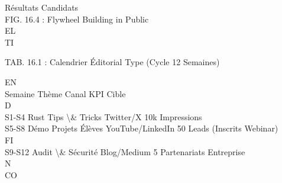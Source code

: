 \documentclass[12pt,landscape,a4paper]{article}
\begin{document}
\vspace{0.5em}
\vspace{0.5em}
\vspace{0.5em}
\vspace{0.5em}
Résultats      Candidats\\
\vspace{0.5em}
\vspace{0.5em}
FIG. 16.4 : Flywheel Building in Public\\
\vspace{0.5em}
\vspace{0.5em}
\vspace{0.5em}
\vspace{0.5em}
EL\\
TI\\
\begin{center}\begin{tabular}TAB. 16.1 : Calendrier Éditorial Type (Cycle 12 Semaines)\end{tabular}\end{center}
\vspace{0.5em}
\vspace{0.5em}
\vspace{0.5em}
\vspace{0.5em}
EN\\
Semaine Thème               Canal            KPI Cible\\
\vspace{0.5em}
\vspace{0.5em}
\vspace{0.5em}
\vspace{0.5em}
D\\
S1-S4   Rust Tips \textbackslash{}& Tricks Twitter/X         10k Impressions\\
S5-S8   Démo Projets Élèves YouTube/LinkedIn 50 Leads (Inscrits Webinar)\\
\vspace{0.5em}
\vspace{0.5em}
\vspace{0.5em}
\vspace{0.5em}
FI\\
S9-S12  Audit \textbackslash{}& Sécurité    Blog/Medium      5 Partenariats Entreprise\\
\vspace{0.5em}
N\\
CO\\
\vspace{0.5em}
\vspace{0.5em}
\vspace{0.5em}
\end{document}
